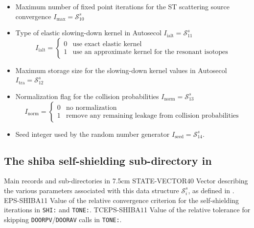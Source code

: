 \begin{itemize}
\item Maximum number of fixed point iterations for the ST scattering source convergence $I_{\mathrm{max}}=\mathcal{S}^{s}_{10}$ 

\item Type of elastic slowing-down kernel in Autosecol $I_{\mathrm{ialt}}=\mathcal{S}^{s}_{11}$ 
\begin{displaymath}
I_{\mathrm{ialt}} = \left\{
\begin{array}{ll}
0 & \textrm{use exact elastic kernel} \\
1 & \textrm{use an approximate kernel for the resonant isotopes}
\end{array} \right.
\end{displaymath}

\item Maximum storage size for the slowing-down kernel values in Autosecol $I_{\mathrm{tra}}=\mathcal{S}^{s}_{12}$ 

\item Normalization flag for the collision probabilities $I_{\mathrm{norm}}=\mathcal{S}^{s}_{13}$ 
\begin{displaymath}
I_{\mathrm{norm}} = \left\{
\begin{array}{ll}
0 & \textrm{no normalization} \\
1 & \textrm{remove any remaining leakage from collision probabilities}
\end{array} \right.
\end{displaymath}

\item Seed integer used by the random number generator $I_{\mathrm{seed}}=\mathcal{S}^{s}_{14}$.

\end{itemize}

\clearpage

\subsection{The {\sc shiba} self-shielding sub-directory  in
}\label{sect:shibadirselfshield}

\begin{DescriptionEnregistrement}{Main records and sub-directories in }{7.5cm}
\IntEnr
  {STATE-VECTOR}{$40$}
  {Vector describing the various parameters associated with this data structure $\mathcal{S}^{s}_{i}$,
  as defined in .}
\RealEnr
  {EPS-SHIBA}{$1$}{1}
  {Value of the relative convergence criterion for the self-shielding iterations in {\tt SHI:} and {\tt TONE:}.}
\RealEnr
  {TCEPS-SHIBA}{$1$}{1}
  {Value of the relative tolerance for skipping {\tt DOORPV}/{\tt DOORAV} calls in {\tt TONE:}. }
\end{DescriptionEnregistrement}

